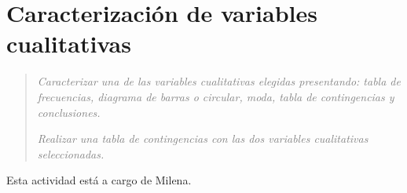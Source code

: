 \section*{Caracterización de variables cualitativas}
\begin{quotation}\emph{\textcolor{gray}{
    Caracterizar una de las variables cualitativas elegidas presentando: tabla de frecuencias, diagrama de barras o circular, moda, tabla de contingencias y conclusiones.}}\par
    \emph{\textcolor{gray}{Realizar una tabla de contingencias con las dos variables cualitativas seleccionadas.}}
\end{quotation}
Esta actividad está a cargo de Milena.